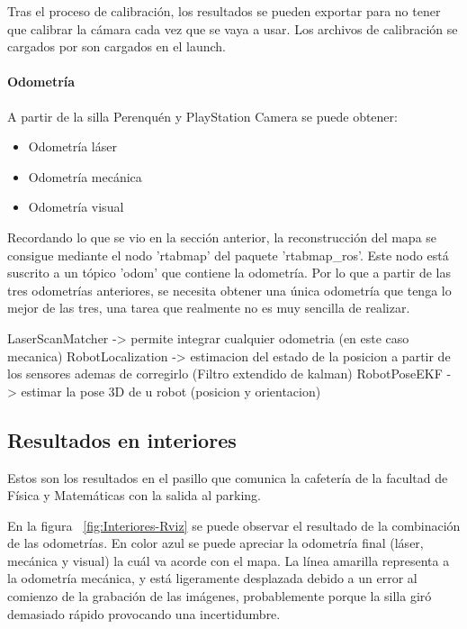 Tras el proceso de calibración, los resultados se pueden exportar para no tener
que calibrar la cámara cada vez que se vaya a usar. Los archivos de calibración
se cargados por son cargados en el launch. %

\paragraph{Odometría} \hspace{0pt}

A partir de la silla Perenquén y PlayStation Camera se puede obtener:

\begin{itemize}
  \item Odometría láser
  \item Odometría mecánica
  \item Odometría visual
\end{itemize}

Recordando lo que se vio en la sección anterior, la reconstrucción del mapa se
consigue mediante el nodo 'rtabmap' del paquete 'rtabmap\_ros'. Este nodo está
suscrito a un tópico 'odom' que contiene la odometría. Por lo que a partir de
las tres odometrías anteriores, se necesita obtener una única odometría que
tenga lo mejor de las tres, una tarea que realmente no es muy sencilla de
realizar.


LaserScanMatcher -> permite integrar cualquier odometria (en este caso mecanica)
RobotLocalization -> estimacion del estado de la posicion a partir de los sensores ademas de corregirlo (Filtro extendido de kalman)
RobotPoseEKF -> estimar la pose 3D de u robot (posicion y orientacion)

\subsection{Resultados en interiores}

Estos son los resultados en el pasillo que comunica la cafetería de la facultad
de Física y Matemáticas con la salida al parking.

En la figura ~\ref{fig:Interiores-Rviz} se puede observar el resultado de la
combinación de las odometrías. En color azul se puede apreciar la odometría
final (láser, mecánica y visual) la cuál va acorde con el mapa. La línea
amarilla representa a la odometría mecánica, y está ligeramente desplazada
debido a un error al comienzo de la grabación de las imágenes, probablemente
porque la silla giró demasiado rápido provocando una incertidumbre.


